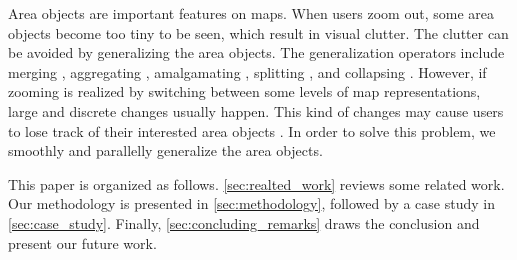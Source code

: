 \documentclass{ica}
\begin{document}


Area objects are important features on maps. 
When users zoom out,
some area objects become too tiny to be seen,
which result in visual clutter.
The clutter can be avoided by generalizing the 
area objects.
The generalization operators include
merging \citep[\eg][]{HaunertWolff2010AreaAgg}, 
aggregating \citep[\eg][]{Shen2019Aggregation}, 
amalgamating \citep[\eg][]{Regnauld2007Amalgamation}, 
splitting \citep[\eg][]{Meijers2016Split}, 
and collapsing \citep[\eg][]{Haunert2008Skeleton}.
However, if zooming is realized by switching between
some levels of map representations, 
large and discrete changes usually happen.
This kind of changes may cause users to lose track of
their interested area objects \citep{vanKreveld2001}.
In order to solve this problem, 
we smoothly and parallelly generalize the area objects.

This paper is organized as follows.
\sect\ref{sec:realted_work} reviews some related work.
Our methodology is presented in \sect\ref{sec:methodology},
followed by a case study in \sect\ref{sec:case_study}.
Finally, \sect\ref{sec:concluding_remarks} draws the conclusion
and present our future work.





%
%
\end{document}
